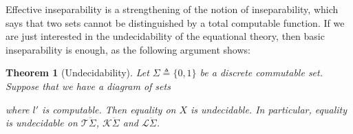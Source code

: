 \documentclass[11pt,a4paper]{amsart}
\newtheorem{theorem}{Theorem}
\theoremstyle{definition}
\begin{document}
Effective inseparability is a strengthening of the notion of inseparability,
which says that two sets cannot be distinguished by a total computable
function.  If we are just interested in the undecidability of the equational
theory, then basic inseparability is enough, as the following argument shows:


\begin{theorem}[Undecidability]
  \label{thm:undecidability}
  Let $ \Sigma   \triangleq  \{0,1\}$ be a discrete commutable set.  Suppose that we have a
  diagram of sets
  \begin{center}
  \end{center}
  where $l'$ is computable.  Then equality on $X$ is undecidable.  In
  particular, equality is undecidable on $\mathcal{T}\ddot{ \Sigma }$,
  $\mathcal{K}\ddot{ \Sigma }$ and $\mathcal{L}\ddot{ \Sigma }$.
\end{theorem}
\end{document}
